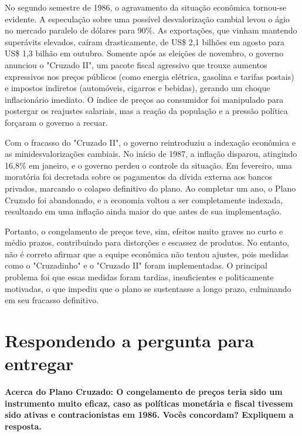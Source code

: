 \documentclass[a4paper,12pt]{article}[abntex2]
\begin{document}
No segundo semestre de 1986, o agravamento da situação econômica tornou-se evidente. A especulação sobre uma possível desvalorização cambial levou o ágio no mercado paralelo de dólares para 90\%. As exportações, que vinham mantendo superávits elevados, caíram drasticamente, de US\$ 2,1 bilhões em agosto para US\$ 1,3 bilhão em outubro. Somente após as eleições de novembro, o governo anunciou o "Cruzado II", um pacote fiscal agressivo que trouxe aumentos expressivos nos preços públicos (como energia elétrica, gasolina e tarifas postais) e impostos indiretos (automóveis, cigarros e bebidas), gerando um choque inflacionário imediato. O índice de preços ao consumidor foi manipulado para postergar os reajustes salariais, mas a reação da população e a pressão política forçaram o governo a recuar.

Com o fracasso do "Cruzado II", o governo reintroduziu a indexação econômica e as minidesvalorizações cambiais. No início de 1987, a inflação disparou, atingindo 16,8\% em janeiro, e o governo perdeu o controle da situação. Em fevereiro, uma moratória foi decretada sobre os pagamentos da dívida externa aos bancos privados, marcando o colapso definitivo do plano. Ao completar um ano, o Plano Cruzado foi abandonado, e a economia voltou a ser completamente indexada, resultando em uma inflação ainda maior do que antes de sua implementação.

Portanto, o congelamento de preços teve, sim, efeitos muito graves no curto e médio prazos, contribuindo para distorções e escassez de produtos. No entanto, não é correto afirmar que a equipe econômica não tentou ajustes, pois medidas como o "Cruzadinho" e o "Cruzado II" foram implementadas. O principal problema foi que essas medidas foram tardias, insuficientes e politicamente motivadas, o que impediu que o plano se sustentasse a longo prazo, culminando em seu fracasso definitivo.

\newpage
\section{\textbf{Respondendo a pergunta para entregar}}
\textbf{Acerca do Plano Cruzado: O congelamento de preços teria sido um instrumento muito eficaz, caso as políticas monetária e fiscal tivessem sido ativas e contracionistas em 1986. Vocês concordam? Expliquem a resposta.}
\end{document}

